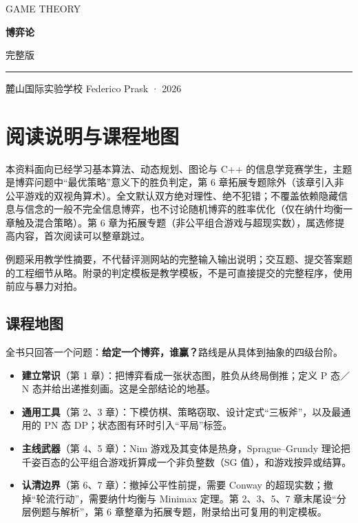 \documentclass[UTF8,a4paper,11pt,oneside,openany,fontset=fandol]{ctexbook}
\theoremstyle{definition}
\begin{document}
\frontmatter
\begin{titlepage}
\setlength{\parindent}{0pt}
\vspace*{1.2cm}
{\large\color{accent}GAME THEORY}\par
\vspace{1cm}
{\fontsize{46}{56}\selectfont\bfseries\color{ink}博弈论}\par
\vspace{0.5cm}
{\Large 完整版}\par
\vspace{0.5cm}
{\color{accent}\rule{\textwidth}{1.2pt}}\par
\vspace{0.3cm}
\begin{minipage}{0.9\textwidth}
\large 麓山国际实验学校 Federico Prask · 2026
\end{minipage}\par
\vfill
{\normalsize }\par
{\small}
\end{titlepage}
\chapter*{阅读说明与课程地图}

\begin{pitfall}[适用范围与阅读边界]
本资料面向已经学习基本算法、动态规划、图论与 C++ 的信息学竞赛学生，主题是博弈问题中“最优策略”意义下的胜负判定，第 6 章拓展专题除外（该章引入非公平游戏的双视角算术）。全文默认双方绝对理性、绝不犯错；不覆盖依赖隐藏信息与信念的一般不完全信息博弈，也不讨论随机博弈的胜率优化（仅在纳什均衡一章触及混合策略）。第 6 章为拓展专题（非公平组合游戏与超现实数），属选修提高内容，首次阅读可以整章跳过。

例题采用教学性摘要，不代替评测网站的完整输入输出说明；交互题、提交答案题的工程细节从略。附录的判定模板是教学模板，不是可直接提交的完整程序，使用前应与暴力对拍。
\end{pitfall}

\section*{课程地图}
全书只回答一个问题：\textbf{给定一个博弈，谁赢？}路线是从具体到抽象的四级台阶。

\begin{itemize}
\item \textbf{建立常识}（第 1 章）：把博弈看成一张状态图，胜负从终局倒推；定义 P 态／N 态并给出递推刻画。这是全部结论的地基。
\item \textbf{通用工具}（第 2、3 章）：下模仿棋、策略窃取、设计定式“三板斧”，以及最通用的 PN 态 DP；状态图有环时引入“平局”标签。
\item \textbf{主线武器}（第 4、5 章）：Nim 游戏及其变体是热身，Sprague--Grundy 理论把千姿百态的公平组合游戏折算成一个非负整数（SG 值），和游戏按异或结算。
\item \textbf{认清边界}（第 6、7 章）：撤掉公平性前提，需要 Conway 的超现实数；撤掉“轮流行动”，需要纳什均衡与 Minimax 定理。第 2、3、5、7 章末尾设“分层例题与解析”，第 6 章整章为拓展专题，附录给出可复用的判定模板。
\end{itemize}
\end{document}
